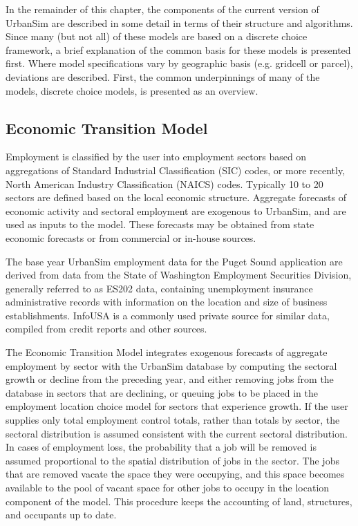 In the remainder of this chapter, the components of the current version of UrbanSim
are described in some detail in terms of their
structure and algorithms.  Since many (but not all) of these models are based on a discrete choice framework,
a brief explanation of the common basis for these models is presented first.  Where model specifications
vary by geographic basis (e.g. gridcell or parcel), deviations are described.  First, the common underpinnings
of many of the models, discrete choice models, is presented as an overview.


\subsection{Economic Transition Model}
\label{sec:model-system-economic-transition-model}
%
Employment is classified by the user into employment sectors based
on aggregations of Standard Industrial Classification (SIC) codes, or more
recently, North American Industry Classification (NAICS) codes.
Typically 10 to 20 sectors are defined based on the local economic
structure. Aggregate forecasts of economic activity and sectoral
employment are exogenous to UrbanSim, and are used as inputs to
the model. These forecasts may be obtained from state economic
forecasts or from commercial or in-house sources.

The base year UrbanSim employment data for the
Puget Sound application are derived from data from the State of Washington
Employment Securities Division, generally referred to
as ES202 data, containing unemployment insurance administrative
records with information on the location and size of business
establishments.  InfoUSA is a commonly used private source for
similar data, compiled from credit reports and other sources.

The Economic Transition Model integrates exogenous forecasts
of aggregate employment by sector with the UrbanSim database by
computing the sectoral growth or decline from the preceding year,
and either removing jobs from the database in sectors that are
declining, or queuing jobs to be placed in the employment location
choice model for sectors that experience growth.  If the user
supplies only total employment control totals, rather than totals
by sector, the sectoral distribution is assumed consistent with
the current sectoral distribution. In cases of employment loss,
the probability that a job will be removed is assumed proportional
to the spatial distribution of jobs in the sector.  The jobs that
are removed vacate the space they were occupying, and this space
becomes available to the pool of vacant space for other jobs to
occupy in the location component of the model.  This procedure
keeps the accounting of land, structures, and occupants up to
date.

